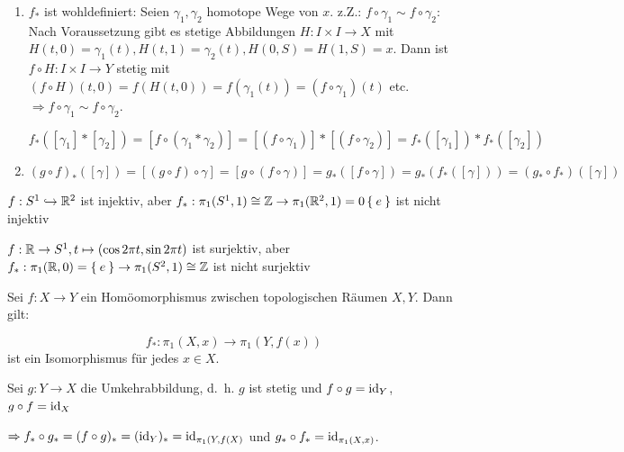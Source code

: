 \begin{beweis}\leavevmode
    \begin{enumerate}[label=\alph*)]
        \item $f_*$ ist wohldefiniert: Seien $\gamma_1, \gamma_2$ homotope
              Wege von $x$. z.Z.: $f \circ \gamma_1 \sim f \circ \gamma_2$:
              Nach Voraussetzung gibt es stetige Abbildungen $H:I\times I \rightarrow X$
              mit $H(t,0) = \gamma_1(t), H(t,1) = \gamma_2(t), H(0,S) = H(1, S) = x$.
              Dann ist $f \circ H: I \times I \rightarrow Y$ stetig mit
              $(f \circ H)(t,0) = f(H(t,0)) = f(\gamma_1(t)) = (f \circ \gamma_1)(t)$
              etc. $\Rightarrow f \circ \gamma_1 \sim f \circ \gamma_2$.

              $f_*([\gamma_1] * [\gamma_2]) = [f \circ (\gamma_1 * \gamma_2)] = [(f \circ \gamma_1)] * [(f \circ \gamma_2)] = f_*([\gamma_1]) * f_*([\gamma_2])$
        \item $(g \circ f)_* ([\gamma]) = [(g \circ f) \circ \gamma] = [g \circ (f \circ \gamma)] = g_* ([f \circ \gamma]) = g_* (f_* ([\gamma])) = (g_* \circ f_*)([\gamma])$
    \end{enumerate}
\end{beweis}

\begin{beispiel}
    \begin{bspenum}
        \item $f:S^1 \hookrightarrow \mathbb{R}^2$ ist injektiv, aber 
              $f_*:\pi_1(S^1, 1) \cong \mathbb{Z} \rightarrow \pi_1(\mathbb{R}^2, 1) = 0 \Set{e}$
              ist nicht injektiv
        \item $f: \mathbb{R} \rightarrow S^1, t \mapsto (\cos 2 \pi t, \sin 2 \pi t)$
              ist surjektiv, aber $f_*: \pi_1(\mathbb{R}, 0) = \Set{e} \rightarrow \pi_1(S^2, 1) \cong \mathbb{Z}$
              ist nicht surjektiv
    \end{bspenum}
\end{beispiel}

\begin{bemerkung}%
    Sei $f:X \rightarrow Y$ ein Homöomorphismus zwischen topologischen
    Räumen $X, Y$. Dann gilt:

    \[f_*: \pi_1(X,x) \rightarrow \pi_1(Y, f(x))\]
    ist ein Isomorphismus für jedes $x \in X$.
\end{bemerkung}

\begin{beweis}
    Sei $g: Y \rightarrow X$ die Umkehrabbildung, d.~h. $g$ ist stetig
    und $f \circ g = \textnormal{id}_Y$, $g \circ f = \textnormal{id}_X$

    $\Rightarrow f_* \circ g_* = (f \circ g)_* = (\textnormal{id}_Y)_* = \textnormal{id}_{\pi_1 (Y, f(X)}$
    und $g_* \circ f_* = \textnormal{id}_{\pi_1(X,x)}$.
\end{beweis}

